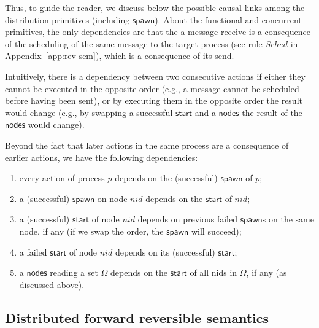 \documentclass[runningheads]{llncs}
\newcommand{\ms}[1]{\mathsf{#1}}
\begin{document}
Thus, to guide the reader, we discuss below the possible
causal links among the distribution primitives (including
$\ms{spawn}$).  About the functional and concurrent primitives, the only
dependencies are that the a message receive is a consequence of the
scheduling of the same message to the target process (see rule
$\mathit{Sched}$ in Appendix~\ref{app:rev-sem}), which is a
consequence of its send.

Intuitively, there is a dependency between two consecutive actions if
either they cannot be executed in the opposite order (e.g., a message
cannot be scheduled before having been sent), or by executing them in
the opposite order the result would change (e.g., by swapping a
successful $\ms{start}$ and a $\ms{nodes}$ the result of the
$\ms{nodes}$ would change).

Beyond the fact that later actions in the same process are a
consequence of earlier actions, we have the following dependencies:
\begin{enumerate}
\item every action of process $p$ depends on the (successful) $\ms{spawn}$
  of $p$;
\item a (successful) $\ms{spawn}$ on node $nid$ depends on the $\ms{start}$ of $nid$;
\item a (successful) $\ms{start}$ of node $nid$ depends on previous failed
  $\ms{spawn}$s on the same node, if any (if we swap the order, the
  $\ms{spawn}$ will succeed);
\item a failed $\ms{start}$ of node $nid$ depends on its (successful)
  $\ms{start}$;
\item a $\ms{nodes}$ reading a set $\Omega$ depends on the $\ms{start}$ of
  all nids in $\Omega$, if any (as discussed above).
\end{enumerate}

\subsection{Distributed forward reversible semantics}
\end{document}
